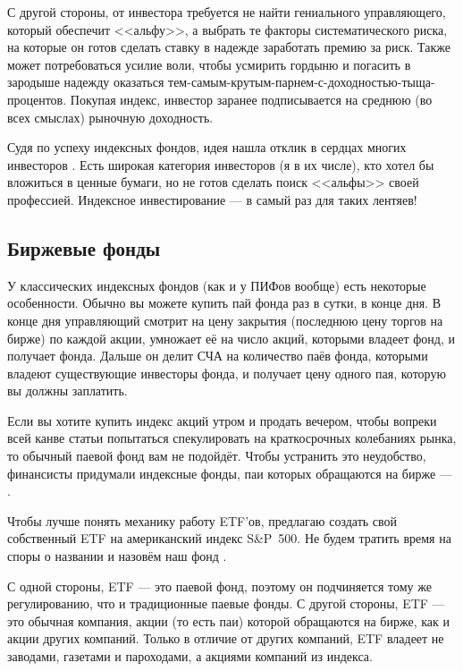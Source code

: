С другой стороны, от инвестора требуется не найти гениального управляющего, 
который обеспечит <<альфу>>, а выбрать те факторы систематического риска, на 
которые он готов сделать ставку в надежде заработать премию за риск. Также может 
потребоваться усилие воли, чтобы усмирить гордыню и погасить в зародыше надежду 
оказаться тем-самым-крутым-парнем-с-доходностью-тыща-процентов. Покупая индекс, 
инвестор заранее подписывается на среднюю (во всех смыслах) рыночную доходность.

Судя по успеху индексных фондов, идея нашла отклик в сердцах многих инвесторов 
\cite{bogle2016index}. Есть широкая категория инвесторов (я в их числе), кто 
хотел бы вложиться в ценные бумаги, но не готов сделать поиск <<альфы>> своей 
профессией. Индексное инвестирование --- в самый раз для таких лентяев!

\subsection{Биржевые фонды}

У классических индексных фондов (как и у ПИФов вообще) есть некоторые 
особенности. Обычно вы можете купить пай фонда раз в сутки, в конце дня. В конце 
дня управляющий смотрит на цену закрытия (последнюю цену торгов на бирже) по 
каждой акции, умножает её на число акций, которыми владеет фонд, и получает 
 фонда. Дальше он делит 
СЧА на количество паёв фонда, которыми владеют существующие инвесторы фонда, и 
получает цену одного пая, которую вы должны заплатить.

Если вы хотите купить индекс акций утром и продать вечером, чтобы вопреки всей 
канве статьи попытаться спекулировать на краткосрочных колебаниях рынка, то 
обычный паевой фонд вам не подойдёт. Чтобы устранить это неудобство, финансисты 
придумали индексные фонды, паи которых обращаются на бирже --- .

Чтобы лучше понять механику работу ETF'ов, предлагаю создать свой собственный 
ETF на американский индекс S\&P~500. Не будем тратить время на споры о названии 
и назовём наш фонд .

С одной стороны, ETF --- это паевой фонд, поэтому он подчиняется тому же 
регулированию, что и традиционные паевые фонды. С другой стороны, ETF --- это 
обычная компания, акции (то есть паи) которой обращаются на бирже, как и акции 
других компаний. Только в отличие от других компаний, ETF владеет не заводами, 
газетами и пароходами, а акциями компаний из индекса.

